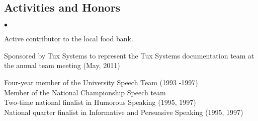 \documentclass[margin,line]{res}
\newenvironment{list2}{
  \begin{list}{$\bullet$}{%
      \setlength{\itemsep}{0in} 
      \setlength{\parsep}{0in} \setlength{\parskip}{0in}
      \setlength{\topsep}{0in} \setlength{\partopsep}{0in} 
      \setlength{\leftmargin}{0.2in}}}{\end{list}}
\begin{document}
\begin{resume}
\section{\sc Activities and Honors} 
\begin{list2}
\item Active contributor to the local food bank.
\item Sponsored by Tux Systems to represent the Tux Systems documentation team 
at the annual team meeting (May, 2011) 
\item Four-year member of the University Speech Team (1993 -1997) \\
     Member of the National Championship Speech team \\
     Two-time national finalist in Humorous Speaking (1995, 1997) \\
     National quarter finalist in Informative and Persuasive Speaking (1995, 1997) \\
\end{list2}
\vspace*{-.3cm}

\end{resume}
\end{document}

